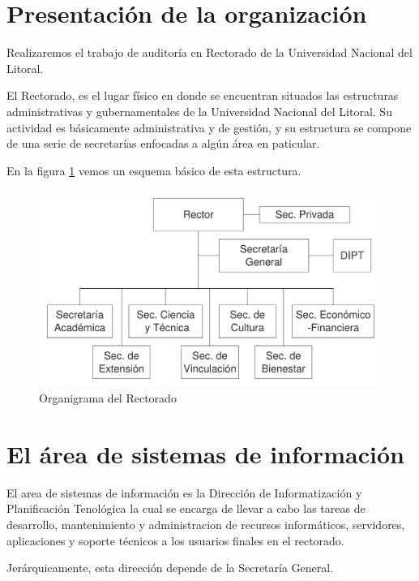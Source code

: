 \documentclass[a4paper,11pt,oneside]{article}
\begin{document}
\maketitle
%
%
\section{Presentación de la organización}
%
Realizaremos el trabajo de auditoría en Rectorado de la Universidad
Nacional del Litoral.

El Rectorado, es el lugar físico en donde se encuentran situados las
estructuras administrativas y gubernamentales de la Universidad
Nacional del Litoral. 
Su actividad es básicamente administrativa y de gestión, y su estructura
se compone de una serie de secretarías enfocadas a algún área en
paticular.

En la figura \ref{organi-rectorado} vemos un esquema básico de esta
estructura.
%
\begin{figure}
  \center\includegraphics[width=127mm]{img/organi_rectorado}
  \caption{Organigrama del Rectorado}
  \label{organi-rectorado}
\end{figure}
%
\section{El área de sistemas de información}
%
El area de sistemas de información es la Dirección de Informatización
y Planificación Tenológica la cual se encarga de llevar a cabo las
tareas de desarrollo, mantenimiento y administracion de recursos
informáticos, servidores, aplicaciones y soporte técnicos a los
usuarios finales en el rectorado.

Jerárquicamente, esta dirección depende de la Secretaría General.
%
\end{document}

